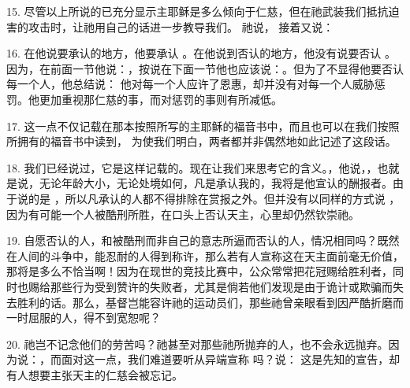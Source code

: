 15. 尽管以上所说的已充分显示主耶稣是多么倾向于仁慈，但在祂武装我们抵抗迫害的攻击时，让祂用自己的话进一步教导我们。 祂说，  接着又说： \par

16. 在他说要承认的地方，他要承认 。在他说到否认的地方，他没有说要否认 。因为，在前面一节他说：，按说在下面一节他也应该说：。但为了不显得他要否认每一个人，他总结说： 他对每一个人应许了恩惠，却并没有对每一个人威胁惩罚。他更加重视那仁慈的事，而对惩罚的事则有所减低。\par

17. 这一点不仅记载在那本按照所写的主耶稣的福音书中，而且也可以在我们按照所拥有的福音书中读到， 为使我们明白，两者都并非偶然地如此记述了这段话。\par

18. 我们已经说过，它是这样记载的。现在让我们来思考它的含义。，他说，，也就是说，无论年龄大小，无论处境如何，凡是承认我的，我将是他宣认的酬报者。由于说的是 ，所以凡承认的人都不得排除在赏报之外。但并没有以同样的方式说 ，因为有可能一个人被酷刑所胜，在口头上否认天主，心里却仍然钦崇祂。\par

19. 自愿否认的人，和被酷刑而非自己的意志所逼而否认的人，情况相同吗？既然在人间的斗争中，能忍耐的人得到称许，那么若有人宣称这在天主面前毫无价值，那将是多么不恰当啊！因为在现世的竞技比赛中，公众常常把花冠赐给胜利者，同时也赐给那些行为受到赞许的失败者，尤其是倘若他们发现是由于诡计或欺骗而失去胜利的话。那么，基督岂能容许祂的运动员们，那些祂曾亲眼看到因严酷折磨而一时屈服的人，得不到宽恕呢？\par

20. 祂岂不记念他们的劳苦吗？祂甚至对那些祂所抛弃的人，也不会永远抛弃。因为说：，而面对这一点，我们难道要听从异端宣称  吗？说： 这是先知的宣告，却有人想要主张天主的仁慈会被忘记。\par


